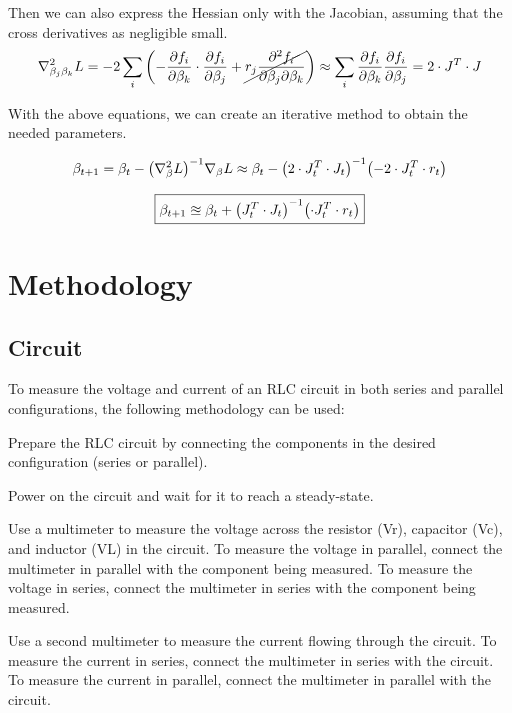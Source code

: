 \documentclass[12pt,twoside]{extarticle}
\begin{document}
Then we can also express the Hessian only with the Jacobian, assuming that the cross derivatives as negligible small.
\begin{equation}
    \laplacian_{\beta_j\beta_k} L = -2 \sum_i \qty(- \pdv{f_i}{\beta_k}\cdot \pdv{f_i}{\beta_j} + \cancel{ r_j \pdv{f_i}{\beta_j}{\beta_k}})  \approx \sum_i \pdv{f_i}{\beta_k}\pdv{f_i}{\beta_j} = 2\cdot J^T\cdot J
\end{equation}

With the above equations, we can create an iterative method to obtain the needed parameters.

\begin{equation}
    \beta_{t+1}= \beta_t - \qty(\laplacian_\beta L)^{-1} \nabla_\beta L \approx \beta_t - \qty(2\cdot J_t^T\cdot J_t)^{-1}\qty(-2 \cdot J^T_t \cdot r_t)
\end{equation}


\begin{equation}
    \boxed{
    \beta_{t+1} \approxeq \beta_t + \qty(J_t^T\cdot J_t)^{-1}\qty(\cdot J^T_t \cdot r_t)
    }
\end{equation}

\section{Methodology}
\subsection{Circuit}
To measure the voltage and current of an RLC circuit in both series and parallel configurations, the following methodology can be used:

Prepare the RLC circuit by connecting the components in the desired configuration (series or parallel).

Power on the circuit and wait for it to reach a steady-state.

Use a multimeter to measure the voltage across the resistor (Vr), capacitor (Vc), and inductor (VL) in the circuit. To measure the voltage in parallel, connect the multimeter in parallel with the component being measured. To measure the voltage in series, connect the multimeter in series with the component being measured.

Use a second multimeter to measure the current flowing through the circuit. To measure the current in series, connect the multimeter in series with the circuit. To measure the current in parallel, connect the multimeter in parallel with the circuit.
\end{document}

